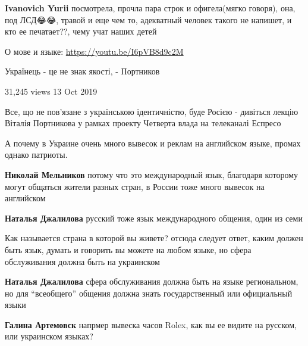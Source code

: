 \begin{itemize}
\textbf{Ivanovich Yurii} посмотрела, прочла пара строк и офигела(мягко говоря),
она, под ЛСД😂😂, травой и еще чем то, адекватный человек такого не напишет, и
кто ее печатает??, чему учат наших детей

О мове и языке:
\url{https://youtu.be/I6pVB8d9c2M}\par
Українець - це не знак якості, - Портников\par
31,245 views 13 Oct 2019\par 
Все, що не пов'язане з українською ідентичністю, буде Росією - дивіться лекцію
Віталія Портникова у рамках проекту Четверта влада на телеканалі Еспресо\par


А почему в Украине очень много вывесок и реклам на английском языке, промах
однако патриоты.

\begin{itemize}
\textbf{Николай Мельников} потому что это международный язык, благодаря
которому могут общаться жители разных стран, в России тоже много вывесок на
английском


\textbf{Наталья Джалилова} русский тоже язык международного общения, один из семи
\end{itemize}


Как называется страна в которой вы живете? отсюда следует ответ, каким должен
быть язык, думать и говорить вы можете на любом языке, но сфера обслуживания
должна быть на украинском

\begin{itemize}
\textbf{Наталья Джалилова} сфера обслуживания должна быть на языке
региональном, но для \enquote{всеобщего} общения должна знать государственный или
официальный языки

\textbf{Галина Артемовск} напрмер вывеска часов Rolex, как вы ее видите на русском, или украинском языках?


\end{itemize}
\end{itemize}
